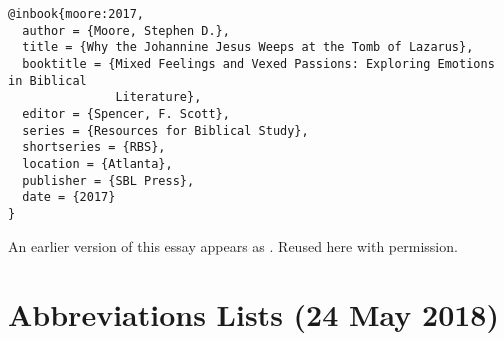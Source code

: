 \documentclass[a4paper]{article}
\begin{document}
\begin{verbatim}
@inbook{moore:2017,
  author = {Moore, Stephen D.},
  title = {Why the Johannine Jesus Weeps at the Tomb of Lazarus},
  booktitle = {Mixed Feelings and Vexed Passions: Exploring Emotions in Biblical
               Literature},
  editor = {Spencer, F. Scott},
  series = {Resources for Biblical Study},
  shortseries = {RBS},
  location = {Atlanta},
  publisher = {SBL Press},
  date = {2017}
}
\end{verbatim}

\begin{verbcite}
  An earlier version of this essay appears as \cite*{moore:2017}. Reused here
  with permission.
\end{verbcite}
\exampleabbreviations
\examplebibliography
{}

\section{Abbreviations Lists (24 May 2018)}
\end{document}

